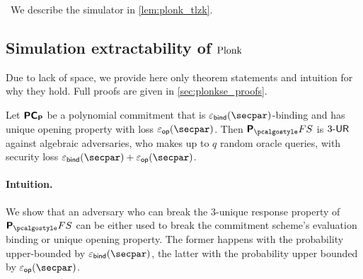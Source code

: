 \ 
We describe the simulator in \cref{lem:plonk_tlzk}.

\subsection{Simulation extractability of $\textnormal{{Plonk}}${}}
Due to lack of space, we provide here only theorem statements and intuition for why they hold. Full proofs are given in \cref{sec:plonkse_proofs}.

\begin{lemma}
	\label{lem:plonkprot_ur}
	Let $\bm{\mathsf{PC}}_{\bm{\mathsf{P}}}$ be a polynomial commitment that is $\epsbind(\secpar)$-binding and has unique opening property with loss $\epsop (\secpar)$. Then $\plonkprotfs$ is ${3\text{-}\mathsf{UR}}$ against algebraic adversaries, who makes up to $q$ random oracle queries, with security loss $\epsbinding (\secpar) + \epsop ( \secpar )$.
\end{lemma}
\paragraph{Intuition.} We show that an adversary who can break the $3$-unique response property of $\plonkprotfs$ can be either used to break the commitment scheme's evaluation binding or unique opening property. The former happens with the probability upper-bounded by $\epsbinding (\secpar)$, the latter with the probability upper bounded by $\epsop (\secpar)$. 

